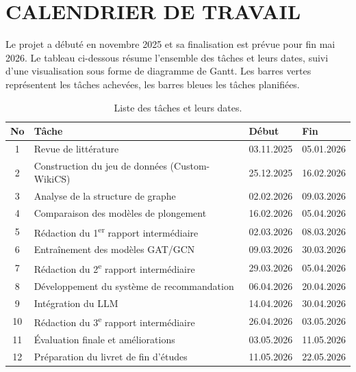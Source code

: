 \chapter{CALENDRIER DE TRAVAIL}
\thispagestyle{empty}

Le projet a débuté en novembre 2025 et sa finalisation est prévue pour fin mai 2026. Le tableau ci-dessous résume l'ensemble des tâches et leurs dates, suivi d'une visualisation sous forme de diagramme de Gantt. Les barres vertes représentent les tâches achevées, les barres bleues les tâches planifiées.

\begin{table}[htbp]
\centering
\caption{Liste des tâches et leurs dates.}
\label{tab:gorevler}
\begin{tabular}{clll}
\toprule
\textbf{No} & \textbf{Tâche} & \textbf{Début} & \textbf{Fin} \\
\midrule
1  & Revue de littérature                     & 03.11.2025 & 05.01.2026 \\
2  & Construction du jeu de données (Custom-WikiCS) & 25.12.2025 & 16.02.2026 \\
3  & Analyse de la structure de graphe        & 02.02.2026 & 09.03.2026 \\
4  & Comparaison des modèles de plongement    & 16.02.2026 & 05.04.2026 \\
5  & Rédaction du 1\textsuperscript{er} rapport intermédiaire & 02.03.2026 & 08.03.2026 \\
\midrule
6  & Entraînement des modèles GAT/GCN        & 09.03.2026 & 30.03.2026 \\
7  & Rédaction du 2\textsuperscript{e} rapport intermédiaire & 29.03.2026 & 05.04.2026 \\
8  & Développement du système de recommandation & 06.04.2026 & 20.04.2026 \\
9  & Intégration du LLM                      & 14.04.2026 & 30.04.2026 \\
10 & Rédaction du 3\textsuperscript{e} rapport intermédiaire & 26.04.2026 & 03.05.2026 \\
11 & Évaluation finale et améliorations      & 03.05.2026 & 11.05.2026 \\
12 & Préparation du livret de fin d'études   & 11.05.2026 & 22.05.2026 \\
\bottomrule
\end{tabular}
\end{table}

